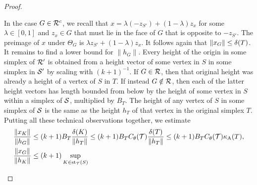 \documentclass[10pt,a4paper]{article}
\begin{document}
\begin{proof}
\begin{itemize}
        In the case $G \in {\mathcal R}^{c}$, we recall that $x = \lambda (-z_{S'}) + (1-\lambda) z_{x}$ for some $\lambda \in [0,1]$ and $z_{x} \in G$
        that must lie in the face of $G$ that is opposite to $-z_{S'}$. 
        The preimage of $x$ under $\Theta_{{G}}$ is $\lambda z_{S'} + (1-\lambda) z_{x}$. 
        It follows again that $\|x_{G}\| \leq {\delta}(T)$. 
        It remains to find a lower bound for $\| h_{G} \|$.
        Every height of the origin in some simplex of ${\mathcal R}'$ is obtained from a height vector of some vertex in $S$ in some simplex in ${\mathcal S}'$
        by scaling with $(k+1)^{-1}$. If $G \in {\mathcal R}$, then that original height was already a height of a vertex of $S$ in $T$. 
        If instead $G \notin {\mathcal R}$, then each of the latter height vectors has length bounded from below by the height of some vertex in $S$ within a simplex of ${\mathcal S}$, multiplied by $B_{T}$. The height of any vertex of $S$ in some simplex of ${\mathcal S}$ is the same as the height $h_T$ of that vertex in the original simplex $T$. 
        Putting all these technical observations together, we estimate 
        \begin{align*}
            \frac{ \| x_{K} \| }{ \| h_{{G}} \| }
            &\leq 
            (k+1)B_{T}
            \frac{ \diam(K) }{ \| h_{T} \| }
            \leq 
            (k+1)B_{T}
            \diameterratio(\calT)
            \frac{ \diam(T) }{ \| h_{T} \| }
            \leq 
            (k+1)B_{T}
            \diameterratio(\calT)
            \aspectratio(T) %
            ,
            \\
            \frac{ \| x_{G} \| }{ \| h_{K} \| }
            &\leq 
            (k+1)
            \sup_{ K \in \patch_{\calT}(S) }

\end{align*}
\end{itemize}
\end{proof}
\end{document}
